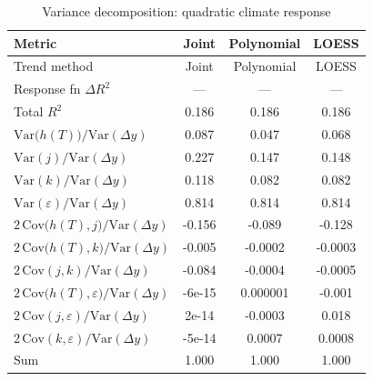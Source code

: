 \begin{table}[htbp]
\centering
\caption{Variance decomposition: quadratic climate response}
\label{tab:variance_decomp_quadratic}

\small
\begin{tabular}{@{}lccc@{}}
\toprule
Metric & Joint & Polynomial & LOESS \\
\midrule
Trend method & Joint & Polynomial & LOESS \\
\midrule
Response fn $\Delta R^2$ & — & — & — \\
Total $R^2$ & 0.186 & 0.186 & 0.186 \\
\midrule
$\mathrm{Var}\!\big(h(T)\big)/\mathrm{Var}(\Delta y)$ & 0.087 & 0.047 & 0.068 \\
$\mathrm{Var}(j)/\mathrm{Var}(\Delta y)$ & 0.227 & 0.147 & 0.148 \\
$\mathrm{Var}(k)/\mathrm{Var}(\Delta y)$ & 0.118 & 0.082 & 0.082 \\
$\mathrm{Var}(\varepsilon)/\mathrm{Var}(\Delta y)$ & 0.814 & 0.814 & 0.814 \\
\midrule
$2\,\mathrm{Cov}\!\big(h(T),j\big)/\mathrm{Var}(\Delta y)$ & -0.156 & -0.089 & -0.128 \\
$2\,\mathrm{Cov}\!\big(h(T),k\big)/\mathrm{Var}(\Delta y)$ & -0.005 & -0.0002 & -0.0003 \\
$2\,\mathrm{Cov}(j,k)/\mathrm{Var}(\Delta y)$ & -0.084 & -0.0004 & -0.0005 \\
$2\,\mathrm{Cov}\!\big(h(T),\varepsilon\big)/\mathrm{Var}(\Delta y)$ & -6e-15 & 0.000001 & -0.001 \\
$2\,\mathrm{Cov}(j,\varepsilon)/\mathrm{Var}(\Delta y)$ & 2e-14 & -0.0003 & 0.018 \\
$2\,\mathrm{Cov}(k,\varepsilon)/\mathrm{Var}(\Delta y)$ & -5e-14 & 0.0007 & 0.0008 \\
\midrule
Sum & 1.000 & 1.000 & 1.000 \\
\bottomrule
\end{tabular}
\end{table}